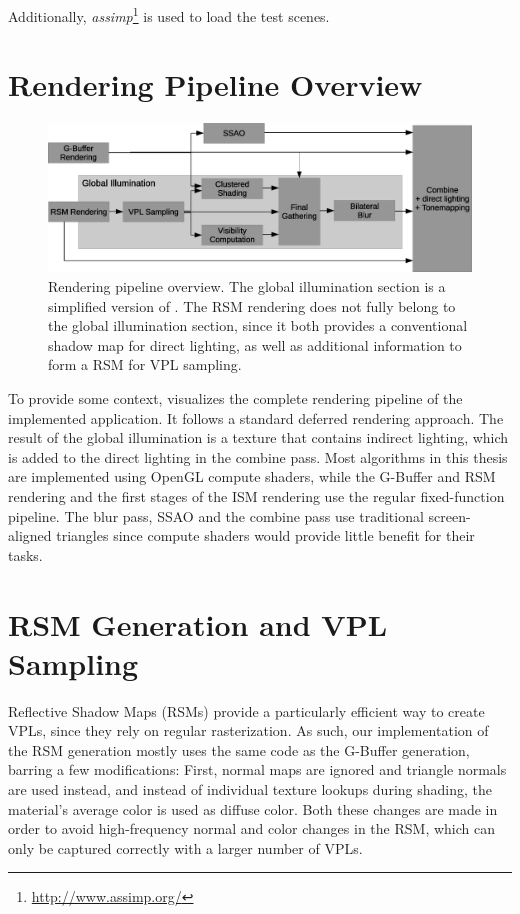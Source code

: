 Additionally, \textit{assimp}\footnote{\url{http://www.assimp.org/}} is used to load the test scenes.


\section{Rendering Pipeline Overview}

\begin{figure}[h]
    \includegraphics[width=\textwidth]{graphics/Rendering_pipeline_rough}
    \caption{Rendering pipeline overview. The global illumination section is a simplified version of . The RSM rendering does not fully belong to the global illumination section, since it both provides a conventional shadow map for direct lighting, as well as additional information to form a RSM for VPL sampling.}
    \label{fig:RenderingPipelineOverview}
\end{figure}


To provide some context,  visualizes the complete rendering pipeline of the implemented application. It follows a standard deferred rendering approach. The result of the global illumination is a texture that contains indirect lighting, which is added to the direct lighting in the combine pass. Most algorithms in this thesis are implemented using OpenGL compute shaders, while the G-Buffer and RSM rendering and the first stages of the ISM rendering use the regular fixed-function pipeline. The blur pass, SSAO and the combine pass use traditional screen-aligned triangles since compute shaders would provide little benefit for their tasks.


\section{RSM Generation and VPL Sampling}
\label{sec:impl:rsmAndVplSampling}

Reflective Shadow Maps (RSMs) provide a particularly efficient way to create VPLs, since they rely on regular rasterization. As such, our implementation of the RSM generation mostly uses the same code as the G-Buffer generation, barring a few modifications: First, normal maps are ignored and triangle normals are used instead, and instead of individual texture lookups during shading, the material's average color is used as diffuse color. Both these changes are made in order to avoid high-frequency normal and color changes in the RSM, which can only be captured correctly with a larger number of VPLs.

